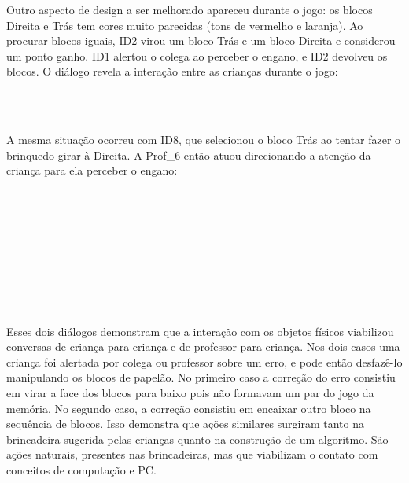 Outro aspecto de design a ser melhorado apareceu durante o jogo: os blocos Direita e Trás tem cores muito parecidas (tons de vermelho e laranja). Ao procurar blocos iguais, ID2 virou um bloco Trás e um bloco Direita e considerou um ponto ganho. ID1 alertou o colega ao perceber o engano, e ID2 devolveu os blocos. O diálogo revela a interação entre as crianças durante o jogo:

\begin{dialogo}
     \\
     \\ 
\end{dialogo}

A mesma situação ocorreu com ID8, que selecionou o bloco Trás ao tentar fazer o brinquedo girar à Direita. A Prof\_6 então atuou direcionando a atenção da criança para ela perceber o engano:

\begin{dialogo}
     \\
     \\
     \\
      \\
     \\
      \\
     \\
      \\
\end{dialogo}

Esses dois diálogos demonstram que a interação com os objetos físicos viabilizou conversas de criança para criança e de professor para criança. Nos dois casos uma criança foi alertada por colega ou professor sobre um erro, e pode então desfazê-lo manipulando os blocos de papelão. No primeiro caso a correção do erro consistiu em virar a face dos blocos para baixo pois não formavam um par do jogo da memória. No segundo caso, a correção consistiu em encaixar outro bloco na sequência de blocos. Isso demonstra que ações similares surgiram tanto na brincadeira sugerida pelas crianças quanto na construção de um algoritmo. São ações naturais, presentes nas brincadeiras, mas que viabilizam o contato com conceitos de computação e \ac{PC}.

